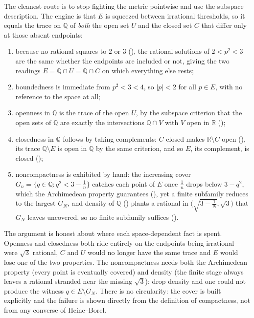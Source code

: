 \documentclass[main.tex]{subfiles}
\begin{document}
\begin{Reflection}
The cleanest route is to stop fighting the metric pointwise and use the subspace description. The
engine is that $E$ is squeezed between irrational thresholds, so it equals the trace on $\mathbb Q$ of
\emph{both} the open set $U$ and the closed set $C$ that differ only at those absent endpoints:
\begin{enumerate}[leftmargin=1.7em,itemsep=3pt,topsep=2pt,label=\textnormal{(\arabic*)}]
  \item because no rational squares to $2$ or $3$ (), the rational solutions of $2<p^2<3$
        are the same whether the endpoints are included or not, giving the two readings $E=\mathbb
        Q\cap U=\mathbb Q\cap C$ on which everything else rests;
  \item boundedness is immediate from $p^2<3<4$, so $|p|<2$ for all $p\in E$, with no reference to the
        space at all;
  \item openness in $\mathbb Q$ is the trace of the open $U$, by the subspace criterion that the open
        sets of $\mathbb Q$ are exactly the intersections $\mathbb Q\cap V$ with $V$ open in $\mathbb R$
        ();
  \item closedness in $\mathbb Q$ follows by taking complements: $C$ closed makes $\mathbb R\setminus C$
        open (), its trace $\mathbb Q\setminus E$ is open in $\mathbb Q$ by the same
        criterion, and so $E$, its complement, is closed ();
  \item noncompactness is exhibited by hand: the increasing cover $G_n=\{q\in\mathbb Q:q^2<3-\tfrac1n\}$
        catches each point of $E$ once $\tfrac1n$ drops below $3-q^2$, which the Archimedean property
        guarantees (), yet a finite subfamily reduces to the largest $G_N$, and density of
        $\mathbb Q$ () plants a rational in $\bigl(\sqrt{3-\tfrac1N},\sqrt3\bigr)$ that
        $G_N$ leaves uncovered, so no finite subfamily suffices ().
\end{enumerate}

The argument is honest about where each space-dependent fact is spent. Openness and closedness both
ride entirely on the endpoints being irrational---were $\sqrt3$ rational, $C$ and $U$ would no longer
have the same trace and $E$ would lose one of the two properties. The noncompactness needs both the
Archimedean property (every point is eventually covered) and density (the finite stage always leaves a
rational stranded near the missing $\sqrt3$); drop density and one could not produce the witness
$q\in E\setminus G_N$. There is no circularity: the cover is built explicitly and the failure is shown
directly from the definition of compactness, not from any converse of Heine--Borel.


\end{Reflection}
\end{document}
